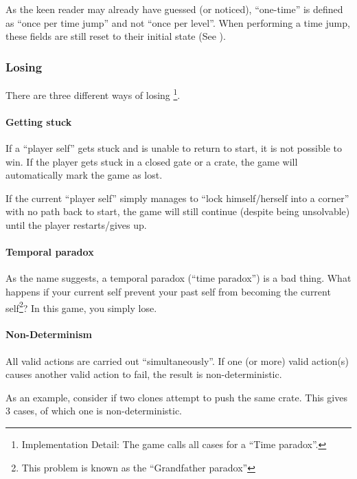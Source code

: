 As the keen reader may already have guessed (or noticed), ``one-time''
is defined as ``once per time jump'' and not ``once per level''.  When
performing a time jump, these fields are still reset to their initial
state (See ).



\subsubsection{Losing}

There are three different ways of losing
\footnote{Implementation Detail: The game calls all cases for a ``Time paradox''.}.

\paragraph{Getting stuck}
If a ``player self'' gets stuck and is unable to return to start, it
is not possible to win.  If the player gets stuck in a closed gate or
a crate, the game will automatically mark the game as lost.

If the current ``player self'' simply manages to ``lock
himself/herself into a corner'' with no path back to start, the game
will still continue (despite being unsolvable) until the player
restarts/gives up.

\paragraph{Temporal paradox}
\label{temporal-paradox}
As the name suggests, a temporal paradox (``time paradox'') is a bad
thing.  What happens if your current self prevent your past self from
becoming the current self\footnote{This problem is known as the
  ``Grandfather paradox''}?  In this game, you simply lose.

\paragraph{Non-Determinism}
All valid actions are carried out ``simultaneously''.  If one (or
more) valid action(s) causes another valid action to fail, the result
is non-deterministic.

As an example, consider if two clones attempt to push the same
crate.  This gives 3 cases, of which one is non-deterministic.

